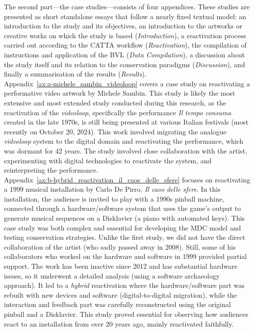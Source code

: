 \newline
The second part—the case studies—consists of four appendices. These studies are presented as short standalone essays that follow a nearly fixed textual model: an introduction to the study and its objectives, an introduction to the artworks or creative works on which the study is based (\textit{Introduction}), a reactivation process carried out according to the CATTA workflow (\textit{Reactivation}), the compilation of instructions and application of the BVL (\textit{Data Compilation}), a discussion about the study itself and its relation to the conservation paradigms (\textit{Discussion}), and finally a summarisation of the results (\textit{Results}).\\
Appendix~\ref{ax:a-michele_sambin_videoloop} covers a case study on reactivating a performative video artwork by Michele Sambin. This study is likely the most extensive and most extended study conducted during this research, as the reactivation of the \textit{videoloop}, specifically the performance \textit{Il tempo consuma} created in the late 1970s, is still being presented at various Italian festivals (most recently on October 20, 2024). This work involved migrating the analogue \textit{videoloop} system to the digital domain and reactivating the performance, which was dormant for 42 years. The study involved close collaboration with the artist, experimenting with digital technologies to reactivate the system, and reinterpreting the performance.\\
Appendix~\ref{ax:b-hybrid_reactivation_il_caos_delle_sfere} focuses on reactivating a 1999 musical installation by Carlo De Pirro, \textit{Il caos delle sfere}. In this installation, the audience is invited to play with a 1990s pinball machine, connected through a hardware/software system that uses the game’s output to generate musical sequences on a Disklavier (a piano with automated keys). This case study was both complex and essential for developing the MDC model and testing conservation strategies. Unlike the first study, we did not have the direct collaboration of the artist (who sadly passed away in 2008). Still, some of his collaborators who worked on the hardware and software in 1999 provided partial support. The work has been inactive since 2012 and has substantial hardware issues, so it underwent a detailed analysis (using a software archaeology approach). It led to a \textit{hybrid} reactivation where the hardware/software part was rebuilt with new devices and software (digital-to-digital migration), while the interaction and feedback part was carefully reconstructed using the original pinball and a Disklavier. This study proved essential for observing how audiences react to an installation from over 20 years ago, mainly reactivated faithfully.\\
